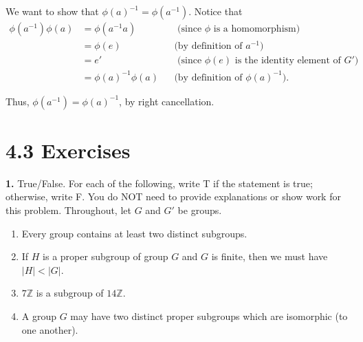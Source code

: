 \documentclass[10pt,]{book}
\theoremstyle{plain}
\theoremstyle{definition}
\theoremstyle{definition}
\theoremstyle{definition}
\theoremstyle{definition}
\numberwithin{equation}{section}
\def\Z{\mathbb{Z}}
\newcommand{\lt}{ < }
\newcommand{\amp}{ & }
\begin{document}
      We want to show that \(\phi(a)^{-1}=\phi(a^{-1})\).
      Notice that
\begin{align*}
\phi(a^{-1})\phi(a)\amp =\phi(a^{-1}a)\amp \amp \text{ (since \(\phi\) is a homomorphism) }\\
\amp =\phi(e)\amp \amp \text{(by definition of \(a^{-1}\))}\\
\amp =e'\amp \amp  \text{ (since \(\phi(e)\) is the identity element of
        \(G'\)) }\\
\amp =\phi(a)^{-1}\phi(a)\amp \amp \text{(by definition of \(\phi(a)^{-1}\))} .
\end{align*}

\par

      Thus, \(\phi(a^{-1})=\phi(a)^{-1}\), by right cancellation.
\par\smallskip
\section*{4.3 Exercises}
\noindent\textbf{1.}\quad{}
        True/False. For each of the following, write T if the statement is
        true; otherwise, write F. You do NOT need to provide explanations or show work for this problem. Throughout, let \(G\) and \(G'\) be groups.
        \leavevmode%
\begin{enumerate}[label=(\alph*)]
\item\hypertarget{li-209}{}
              Every group contains at least two distinct subgroups.
\item\hypertarget{li-210}{}
              If \(H\) is a proper subgroup of group \(G\) and \(G\) is finite, then we must have \(|H|\lt |G|\).
\item\hypertarget{li-211}{}
              \(7\Z\) is a subgroup of \(14\Z\).
\item\hypertarget{li-212}{}
              A group \(G\) may have two distinct proper subgroups which are isomorphic (to one another).
\end{enumerate}
\end{document}
